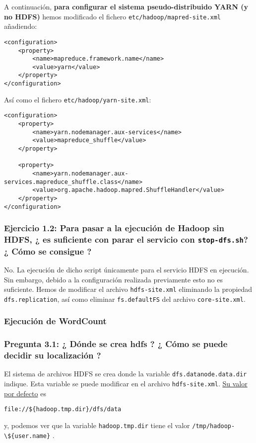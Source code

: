 \documentclass[11pt]{article}
\def\inline{\lstinline[basicstyle=\ttfamily,keywordstyle={}]}
\begin{document}
A continuación, \textbf{para configurar el sistema pseudo-distribuido YARN (y no HDFS)} hemos modificado el fichero \inline{etc/hadoop/mapred-site.xml} añadiendo:

\begin{verbatim}
<configuration>
    <property>
        <name>mapreduce.framework.name</name>
        <value>yarn</value>
    </property>
</configuration>
\end{verbatim}

Así como el fichero \inline{etc/hadoop/yarn-site.xml}:

\begin{verbatim}
<configuration>
    <property>
        <name>yarn.nodemanager.aux-services</name>
        <value>mapreduce_shuffle</value>
    </property>
    
    <property>
        <name>yarn.nodemanager.aux-services.mapreduce_shuffle.class</name>
        <value>org.apache.hadoop.mapred.ShuffleHandler</value>
    </property>
</configuration>
\end{verbatim}

\subsubsection*{ Ejercicio 1.2: Para pasar a la ejecución de Hadoop sin HDFS, ¿ es suficiente con parar el servicio con \inline{stop-dfs.sh}? ¿ Cómo se consigue ? }

No. La ejecución de dicho script únicamente para el servicio HDFS en ejecución. Sin embargo, debido a la configuración realizada previamente esto no es suficiente. Hemos de modificar el archivo \inline{hdfs-site.xml} eliminando la propiedad \inline{dfs.replication}, así como eliminar \inline{fs.defaultFS} del archivo \inline{core-site.xml}.

\subsubsection{ Ejecución de WordCount }

\subsubsection*{ Pregunta 3.1: ¿ Dónde se crea hdfs ? ¿ Cómo se puede decidir su localización ? }

El sistema de archivos HDFS se crea donde la variable \inline{dfs.datanode.data.dir} indique. Esta variable se puede modificar en el archivo \inline{hdfs-site.xml}. \href{https://hadoop.apache.org/docs/r2.4.1/hadoop-project-dist/hadoop-hdfs/hdfs-default.xml}{Su valor por defecto} es
\begin{verbatim}
file://${hadoop.tmp.dir}/dfs/data
\end{verbatim}
y, podemos ver que la variable \inline{hadoop.tmp.dir} tiene el valor \inline|/tmp/hadoop-\${user.name}| .
\end{document}
